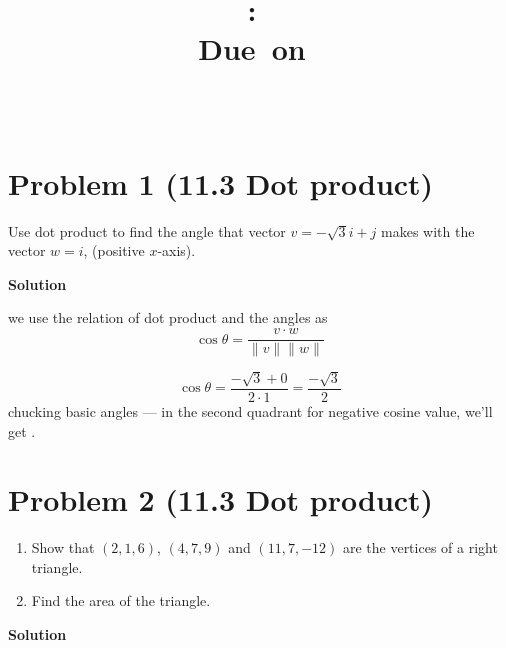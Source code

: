 \documentclass{article}
\title{
    \vspace{2in}
    \textmd{\textbf{\hmwkClass:\ \hmwkTitle}}\\
    \normalsize\vspace{0.1in}\small{Due\ on\ \hmwkDueDate}\\
    \vspace{0.1in}\large{\textit{\hmwkClassInstructor\ \hmwkClassTime}}
    \vspace{3in}
}
\author{\hmwkAuthorName}
\date{}
\newcommand{\solution}{\textbf{\large Solution}}
\theoremstyle{remark}
\begin{document}
\maketitle
\newpage

\section*{Problem 1 (11.3 Dot product)}
Use dot product to find the angle that vector $v = -\sqrt{3} i + j$ makes with the vector $w = i$, (positive $x$-axis).

\medskip
\solution

we use the relation of dot product and the angles as
\[
    \cos \theta = \frac{v \cdot w}{\lVert v \rVert \lVert w \rVert}
\]

\[
    \cos \theta = \frac{-\sqrt{3} + 0}{2 \cdot 1} = \frac{-\sqrt{3}}{2}
\]
chucking basic angles --- in the second quadrant for negative cosine value, we'll get .

\vspace{1em}
\hrulefill

\section*{Problem 2 (11.3 Dot product)}
\begin{enumerate}[label=(\alph*)]
    \item Show that $(2,1,6)$, $(4,7,9)$ and $(11,7,-12)$ are the vertices of a right triangle.
    \item Find the area of the triangle.
\end{enumerate}

\medskip
\solution
\end{document}

